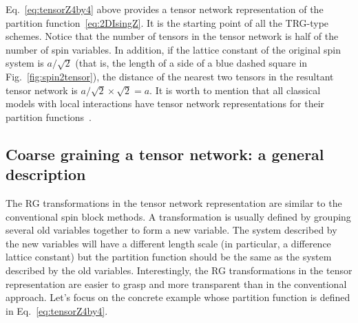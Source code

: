 \documentclass[aps,prb,reprint,superscriptaddress]{revtex4-2}
\begin{document}
%
Eq.~\eqref{eq:tensorZ4by4} above provides a tensor network representation of
the partition function~\eqref{eq:2DIsingZ}. It is the starting point of
all the TRG-type schemes. Notice that the number of tensors in the
tensor network is half of the number of spin variables. In addition, if
the lattice constant of the original spin system is $a/\sqrt{2}$ (that
is, the length of a side of a blue dashed square in
Fig.~\ref{fig:spin2tensor}), the distance of the nearest two tensors in
the resultant tensor network is $a/\sqrt{2} \times \sqrt{2} = a$.
It is worth to mention that all classical
models with local interactions have tensor network
representations for their partition functions~\cite{trg}. 

\subsection{Coarse graining a tensor network: a general
description\label{cgTN}}
The RG transformations in the tensor network representation are similar
to the conventional spin block methods. A transformation is usually
defined by grouping several old variables together to form a new
variable. The system described by the new variables will have a
different length scale (in particular, a difference lattice constant)
but the partition function should be the same as the system described by
the old variables. Interestingly, the RG transformations in the tensor
representation are easier to grasp and more transparent than in the
conventional approach. Let's focus on the concrete example whose
partition function is defined in Eq.~\eqref{eq:tensorZ4by4}. 
%
\end{document}
